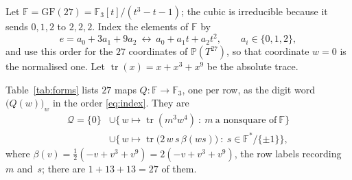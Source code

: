 \documentclass[11pt]{amsart}
\theoremstyle{remark}
\newcommand{\Fq}{\mathbb{F}}
\newcommand{\tr}{\operatorname{tr}}
\newcommand{\GF}{\mathrm{GF}}
\begin{document}
Let $\Fq=\GF(27)=\Fq_{3}[t]/(t^{3}-t-1)$; the cubic is irreducible because it
sends $0,1,2$ to $2,2,2$. Index the elements of $\Fq$ by
\begin{equation}\label{eq:index}
  e=a_{0}+3a_{1}+9a_{2}\ \longleftrightarrow\ a_{0}+a_{1}t+a_{2}t^{2},
  \qquad a_{i}\in\{0,1,2\},
\end{equation}
and use this order for the $27$ coordinates of $\mathbb P(T^{27})$, so that
coordinate $w=0$ is the normalised one. Let $\tr(x)=x+x^{3}+x^{9}$ be the
absolute trace.

Table~\ref{tab:forms} lists $27$ maps $Q\colon\Fq\to\Fq_{3}$, one per row, as
the digit word $\bigl(Q(w)\bigr)_{w}$ in the order \eqref{eq:index}. They are
\begin{equation}\label{eq:qset}
\begin{aligned}
  \mathcal Q=\{0\}
  &\cup\bigl\{\,w\mapsto\tr(m^{3}w^{4})\ :\ m\ \text{a nonsquare of}\ \Fq\bigr\}\\
  &\cup\bigl\{\,w\mapsto\tr\!\bigl(2\,w\,s\,\beta(ws)\bigr)
              \ :\ s\in\Fq^{*}/\{\pm1\}\bigr\},
\end{aligned}
\end{equation}
where $\beta(v)=\tfrac12(-v+v^{3}+v^{9})=2(-v+v^{3}+v^{9})$, the row
labels recording $m$ and~$s$; there are $1+13+13=27$ of them.
\end{document}
